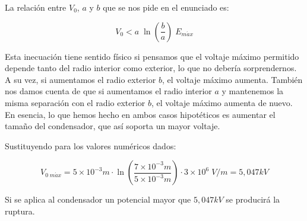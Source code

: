 La relación entre $V_0$, $a$ y $b$ que se nos pide en el enunciado es:

\begin{equation*}
    V_{0} < a\;\ln({\frac{b}{a}})\;E_{m \acute ax}
\end{equation*}

Esta inecuación tiene sentido físico si pensamos que el voltaje máximo permitido depende
tanto del radio interior como exterior, lo que no debería sorprendernos. A su vez, si aumentamos el radio
exterior $b$, el voltaje máximo aumenta. También nos damos cuenta de que si aumentamos el radio interior $a$ y mantenemos la misma
separación con el radio exterior $b$, el voltaje máximo aumenta de nuevo. En esencia, lo que hemos hecho en ambos casos
hipotéticos es aumentar
el tamaño del condensador, que así soporta un mayor voltaje.

Sustituyendo para los valores numéricos dados:

\begin{equation*}
    V_{0\;m\acute ax} = 5 \times 10^{-3}m \cdot \ln({\frac{7 \times 10^{-3}m}{5 \times 10^{-3}m}}) \cdot  3 \times 10^6\;V / m
    = 5,047kV
\end{equation*}

Si se aplica al condensador un potencial mayor que $5,047kV$ se producirá la ruptura.



